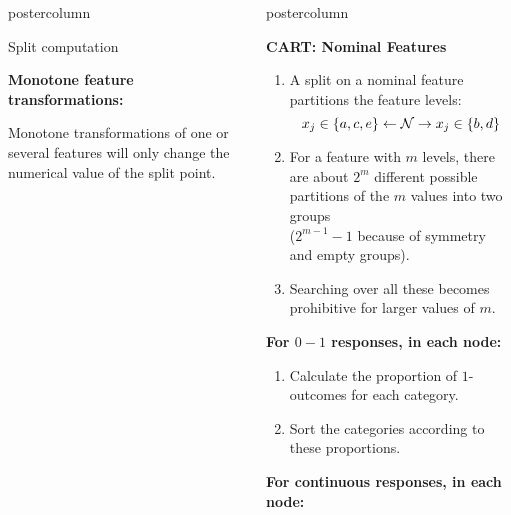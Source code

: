 \documentclass{beamer}
\newlength{\columnheight} %
\begin{document}
\begin{frame}[fragile]{}
\begin{columns}
\begin{column}{.31\textwidth}
\begin{beamercolorbox}[center]{postercolumn}
\begin{minipage}{.98\textwidth}
{\begin{myblock}{Split computation}
			\begin{codebox}
			\textbf{Monotone feature transformations: }	\end{codebox}
			Monotone transformations of one or several features will only change the numerical value of the split point.\\
			\end{myblock}
				}
			\end{minipage}
		\end{beamercolorbox}
	\end{column}
	\begin{column}{.31\textwidth}
		\begin{beamercolorbox}[center]{postercolumn}
			\begin{minipage}{.98\textwidth}
				\parbox[t][\columnheight]{\textwidth}{
				    \begin{myblock}{ }
				    \begin{codebox}
			\textbf{CART: Nominal Features}	\end{codebox}
				        \begin{enumerate}
                        \item A split on a nominal feature partitions the feature levels:
    $$x_j \in \{a,c,e\} \leftarrow \mathcal{N} \rightarrow x_j \in \{b,d\} $$
  \item For a feature with $m$ levels,
  there are about $2^m$ different possible partitions of the $m$ values into two groups\\ ($2^{m-1} - 1$ because of symmetry and empty groups).
  \item Searching over all these becomes prohibitive for larger values of $m$.
                        \end{enumerate}
                        \hspace*{1ex}
						\begin{codebox}
             \textbf{For $0-1$ responses, in each node: }
		    \end{codebox}
						\begin{enumerate}
				\item Calculate the proportion of $1$-outcomes for each category.
            \item Sort the categories according to these proportions.
						\end{enumerate}
						\hspace*{1ex}
						\begin{codebox}
             \textbf{For continuous responses, in each node: }
		    \end{codebox}

\end{myblock}}
\end{minipage}
\end{beamercolorbox}
\end{column}
\end{columns}
\end{frame}
\end{document}
